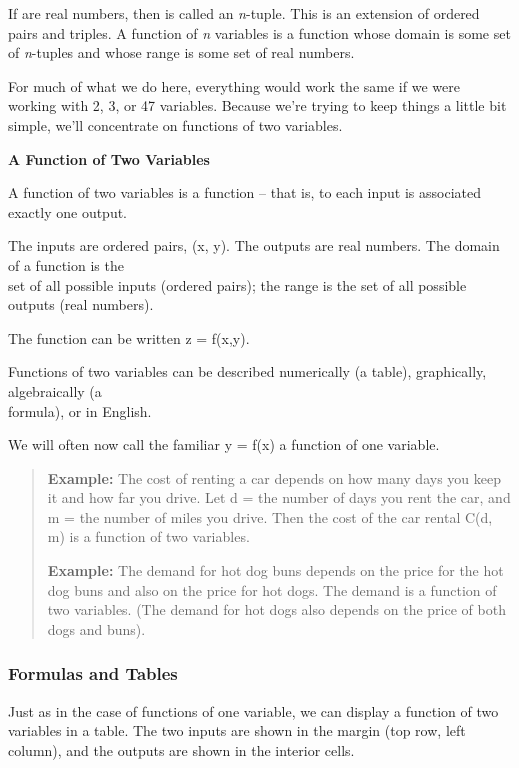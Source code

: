 If are real numbers, then is called an \emph{n}-tuple. This is an
extension of ordered pairs and triples. A function of \emph{n} variables
is a function whose domain is some set of \emph{n}-tuples and whose
range is some set of real numbers.

For much of what we do here, everything would work the same if we were
working with 2, 3, or 47 variables. Because we're trying to keep things
a little bit simple, we'll concentrate on functions of two variables.

\textbf{A Function of Two Variables}

A function of two variables is a function -- that is, to each input is
associated exactly one output.

The inputs are ordered pairs, (x, y). The outputs are real numbers. The
domain of a function is the\\
set of all possible inputs (ordered pairs); the range is the set of all
possible outputs (real numbers).

The function can be written z = f(x,y).

Functions of two variables can be described numerically (a table),
graphically, algebraically (a\\
formula), or in English.

We will often now call the familiar y = f(x) a function of one variable.

\begin{quote}
\textbf{Example:} The cost of renting a car depends on how many days you
keep it and how far you drive. Let d = the number of days you rent the
car, and m = the number of miles you drive. Then the cost of the car
rental C(d, m) is a function of two variables.

\textbf{Example:} The demand for hot dog buns depends on the price for
the hot dog buns and also on the price for hot dogs. The demand is a
function of two variables. (The demand for hot dogs also depends on the
price of both dogs and buns).
\end{quote}

\subsubsection{Formulas and Tables}\label{formulas-and-tables}

Just as in the case of functions of one variable, we can display a
function of two variables in a table. The two inputs are shown in the
margin (top row, left column), and the outputs are shown in the interior
cells.

